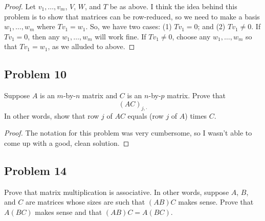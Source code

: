 \documentclass[letterpaper, 12pt]{amsart}
\theoremstyle{definition}  %
\begin{document}
		\begin{proof}
		Let $v_{1}, \dots, v_{m}$, $V$, $W$, and $T$ be as above.
		I think the idea behind this problem is to show that matrices can be row-reduced, so we need to make a basis $w_{1}, \dots, w_{m}$ where $Tv_{1} = w_{1}$.
		So, we have two cases: (1) $Tv_{1} = 0$; and (2) $Tv_{1} \neq 0$.
		If $Tv_{1} = 0$, then any $w_{1}, \dots, w_{m}$ will work fine.
		If $Tv_{1} \neq 0$, choose any $w_{1}, \dots, w_{m}$ so that $Tv_{1} = w_{1}$, as we alluded to above.
		\end{proof}

		\subsection*{Problem 10}
		Suppose $A$ is an $m$-by-$n$ matrix and $C$ is an $n$-by-$p$ matrix. 
		Prove that $$(AC)_{j,\cdot}$$
		In other words, show that row $j$ of $AC$ equals (row $j$ of $A$) times $C$.

		\begin{proof}
		The notation for this problem was very cumbersome, so I wasn't able to come up with a good, clean solution.
		\end{proof}

		\subsection*{Problem 14}
		Prove that matrix multiplication is associative. 
		In other words, suppose $A$, $B$, and $C$ are matrices whose sizes are such that $(AB)C$ makes sense. Prove that $A(BC)$ makes sense and that $(AB)C = A(BC)$.
\end{document}

